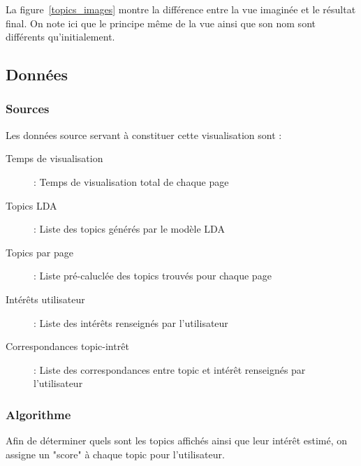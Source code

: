 		La figure~\ref{topics_images} montre la différence entre la vue imaginée et le résultat final. On note ici que le principe même de la vue ainsi que son nom sont différents qu'initialement.

	\subsection{Données}

		\subsubsection{Sources}

			Les données source servant à constituer cette visualisation sont :
			\begin{description}
				\item[Temps de visualisation] : Temps de visualisation total de chaque page 
				\item[Topics LDA] : Liste des topics générés par le modèle LDA
				\item[Topics par page] : Liste pré-caluclée des topics trouvés pour chaque page
				\item[Intérêts utilisateur] : Liste des intérêts renseignés par l'utilisateur
				\item[Correspondances topic-intrêt] : Liste des correspondances entre topic et intérêt renseignés par l'utilisateur 
			\end{description}

		\subsubsection{Algorithme}

			Afin de déterminer quels sont les topics affichés ainsi que leur intérêt estimé, on assigne un "score" à chaque topic pour l'utilisateur.

